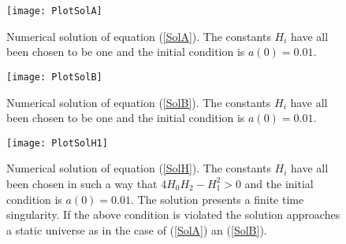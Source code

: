 \documentclass[a4paper,aps,onecolumn,nofootinbib]{revtex4}
\def\rf#1{(\ref{#1})}
\begin{document}
\begin{figure}[htbp]
\begin{center}
\texttt{[image: PlotSolA]}
\caption{Numerical solution of equation \rf{SolA}. The constants $H_i$ have all been chosen to be one and the initial condition is $a(0)=0.01$.}
\label{PlotSolA}
\end{center}
\end{figure}
\begin{figure}[htbp]
\begin{center}
\texttt{[image: PlotSolB]}
\caption{Numerical solution of equation \rf{SolB}. The constants $H_i$ have all been chosen to be one and the initial condition is $a(0)=0.01$.}
\label{PlotSolB}
\end{center}
\end{figure}
\begin{figure}[htbp]
\begin{center}
\texttt{[image: PlotSolH1]}
\caption{Numerical solution of equation \rf{SolH}. The constants $H_i$ have all been chosen in such a way that  $4 H_0 H_2-H_1^2>0$ and the initial condition is $a(0)=0.01$. The solution presents a finite time singularity. If the above condition is violated the solution approaches a static universe as in the case of \rf{SolA} an \rf{SolB}. }
\label{PlotSolB}
\end{center}
\end{figure}
\end{document}
